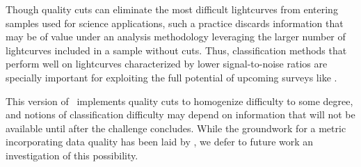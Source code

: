 Though quality cuts can eliminate the most difficult lightcurves from entering samples used for science applications, such a practice discards information that may be of value under an analysis methodology leveraging the larger number of lightcurves included in a sample without cuts.
Thus, classification methods that perform well on lightcurves characterized by lower signal-to-noise ratios are specially important for exploiting the full potential of upcoming surveys like \lsst.

This version of \plasticc\ implements quality cuts to homogenize difficulty to some degree, and notions of classification difficulty may depend on information that will not be available until after the challenge concludes.
While the groundwork for a metric incorporating data quality has been laid by \citet{wu_radio_2018}, we defer to future work an investigation of this possibility.
